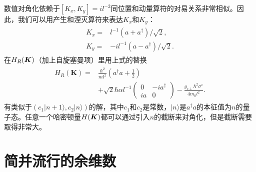 数值对角化依赖于$[K_x,K_y]=il^{-2}$同位置和动量算符的对易关系非常相似。因此，我们可以用产生和湮灭算符来表达$K_x$和$K_y$：
\begin{align}
\begin{split}
K_x=&l^{-1}(a+a^\dagger)/\sqrt{2},\\
K_y=&-il^{-1}(a-a^\dagger)/\sqrt{2}.
\end{split}
\end{align}
在$H_R(\boldsymbol{K})$（加上自旋塞曼项）里用上式的替换
\begin{align}
\begin{split}
H_{R}(\boldsymbol{K})=&\frac{\hbar^2}{ml^2}(a^{\dagger}a+\frac{1}{2})
\\&+\sqrt{2}\hbar\alpha l^{-1}\left(\begin{array}{cc}
0 & -ia^{\dagger}\\
ia & 0
\end{array}\right)
-\frac{g_{s\perp}\hbar^2\sigma^z}{4m_0l^2}.
\end{split}\label{eq:Rashba-ho}
\end{align}
有类似于$(c_1|n+1\rangle,c_2|n\rangle)$的解，其中$c_1$和$c_2$是常数，$|n\rangle$是$a^\dagger a$的本征值为$n$的量子态。任意一个哈密顿量$H(\boldsymbol{K})$都可以通过引入$n$的截断来对角化，但是截断需要取得非常大。

\chapter{简并流行的余维数}\label{app:codimension}

